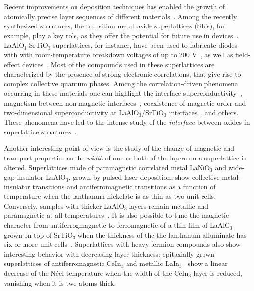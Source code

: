 \documentclass[aps,pra,reprint,twocolumn,showpacs,longbibliography,superscriptaddress]{revtex4-1}
\begin{document}
Recent improvements on deposition techniques has enabled the growth of atomically precise layer sequences of different materials~\cite{Chakhalian2014}. Among the recently synthesized structures, the transition metal oxide superlattices (SL's), for example, play a key role, as they offer the potential for future use in devices~\cite{review-science}. LaAlO$_3$-SrTiO$_3$ superlattices, for instance, have been used to fabricate diodes with with room-temperature breakdown voltages of up to 200 V~\cite{Jany2010}, as well as field-effect devices~\cite{Forg2012, Zhou2013, Chen2016}. Most of the compounds used in these superlattices are characterized by the presence of strong electronic correlations, that give rise to complex collective quantum phases. Among the correlation-driven phenomena occurring in these materials one can highlight the interface superconductivity~\cite{Reyren2007}, magnetism between non-magnetic interfaces~\cite{Brinkman2007}, coexistence of magnetic order and two-dimensional superconductivity at LaAlO$_3$/SrTiO$_3$ interfaces~\cite{Li2011}, and others. These phenomena have led to the intense study of the {\it interface} between oxides in superlattice structures~\cite{review-oxides, review-science}.


Another interesting point of view is the study of the change of magnetic and transport properties as the {\it width} of one or both of the layers on a superlattice is altered. 
Superlattices made of paramagnetic correlated metal LaNiO$_3$ and wide-gap insulator LaAlO$_3$, grown by pulsed laser deposition, show collective metal-insulator transitions and antiferromagnetic transitions as a function of temperature when the lanthanum nickelate is as thin as two unit cells. Conversely, samples with thicker LaAlO$_3$ layers remain metallic and paramagnetic at all temperatures~\cite{Boris2011}. It is also possible to tune the magnetic character from antiferrogmagnetic to ferromagnetic of a thin film of LaAlO$_3$ grown on top of SrTiO$_3$ when the thickness of the the lanthanum alluminate has six or more unit-cells~\cite{Wang2015}.
Superlattices with heavy fermion compounds also show interesting behavior with decreasing layer thickness: epitaxially grown superlattices of antiferromagnetic  CeIn$_3$ and metallic LaIn$_3$~\cite{Shishido2010} show a linear  decrease  of the N\'eel temperature when the width of the CeIn$_3$ layer is reduced, vanishing when it is two atoms thick. 
\end{document}
